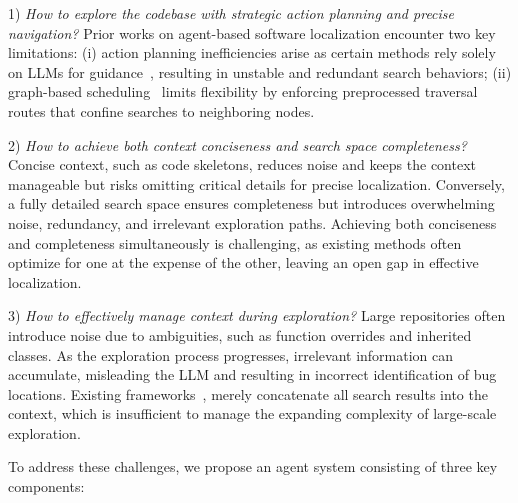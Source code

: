 1) \textit{How to explore the codebase with strategic action planning and precise navigation?}  
Prior works 
on agent-based software localization 
encounter two key limitations: 
(i) action planning inefficiencies arise as %
certain methods rely solely on LLMs for guidance~\cite{autocoderover}, resulting in unstable and redundant search behaviors; 
(ii) graph-based scheduling~\cite{repounderstander} 
limits flexibility by enforcing preprocessed traversal routes that confine searches to neighboring nodes. 


2) \textit{How to achieve both context conciseness and search space completeness?} 
Concise context, such as code skeletons, reduces noise and keeps the context manageable but risks omitting critical details for precise localization.
Conversely, a fully detailed search space ensures completeness but introduces overwhelming noise, redundancy, and irrelevant exploration paths.
Achieving both conciseness and completeness simultaneously is challenging, as existing methods often optimize for one at the expense of the other, leaving an open gap in effective localization.

3) \textit{How to effectively manage context during exploration?} %
Large repositories often introduce noise due to ambiguities, such as function overrides and inherited classes.
As the exploration process progresses, 
irrelevant information can accumulate, 
misleading the LLM and resulting in 
incorrect identification of bug locations. 
Existing frameworks~\cite{autocoderover, wang2024openhands}, merely concatenate all search results into the context, which is insufficient to manage the expanding complexity of large-scale exploration.



To address these challenges, we propose an agent system consisting of three key components:

